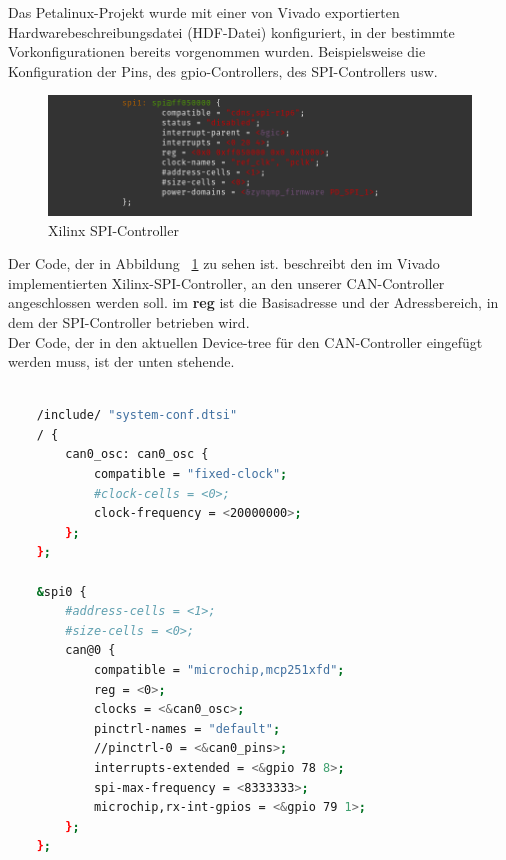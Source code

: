 Das Petalinux-Projekt wurde mit einer von Vivado exportierten Hardwarebeschreibungsdatei (HDF-Datei) konfiguriert, in der bestimmte Vorkonfigurationen bereits vorgenommen wurden. Beispielsweise die Konfiguration der Pins, des gpio-Controllers, des SPI-Controllers usw. 

\begin{figure}[H]
	\begin{center}		\includegraphics[width=1\textwidth]{./images/xilinx_spi_controller.jpg}
	\end{center}
	\vspace{-5pt}
	\caption[Xilinx SPI-Controller]{Xilinx SPI-Controller} %
	\label{fig:deviceTree:spi:controller}
	\vspace{-5pt}
\end{figure}

Der Code, der in Abbildung ~\ref{fig:deviceTree:spi:controller} zu sehen ist. beschreibt den im Vivado implementierten Xilinx-SPI-Controller, an den unserer CAN-Controller angeschlossen werden soll. im \textbf{reg} ist die Basisadresse und der Adressbereich, in dem der SPI-Controller betrieben wird. \\
Der Code, der in den aktuellen Device-tree für den CAN-Controller eingefügt werden muss, ist der unten stehende.
\begin{lstlisting}[backgroundcolor = \color{lightgray},basicstyle=\scriptsize\ttfamily,caption={Device-tree Eintrag für den mcp251xfd CAN-Controller},label=lst:device:tree:mcp,language=bash,framexleftmargin = 2em]
	
	/include/ "system-conf.dtsi"
	/ {
		can0_osc: can0_osc {
			compatible = "fixed-clock";
			#clock-cells = <0>;
			clock-frequency = <20000000>;
		};
	};
	
	&spi0 {
		#address-cells = <1>;
		#size-cells = <0>;
		can@0 {
			compatible = "microchip,mcp251xfd";
			reg = <0>;
			clocks = <&can0_osc>;
			pinctrl-names = "default";
			//pinctrl-0 = <&can0_pins>;
			interrupts-extended = <&gpio 78 8>;
			spi-max-frequency = <8333333>;
			microchip,rx-int-gpios = <&gpio 79 1>;
		};
	};
\end{lstlisting}

